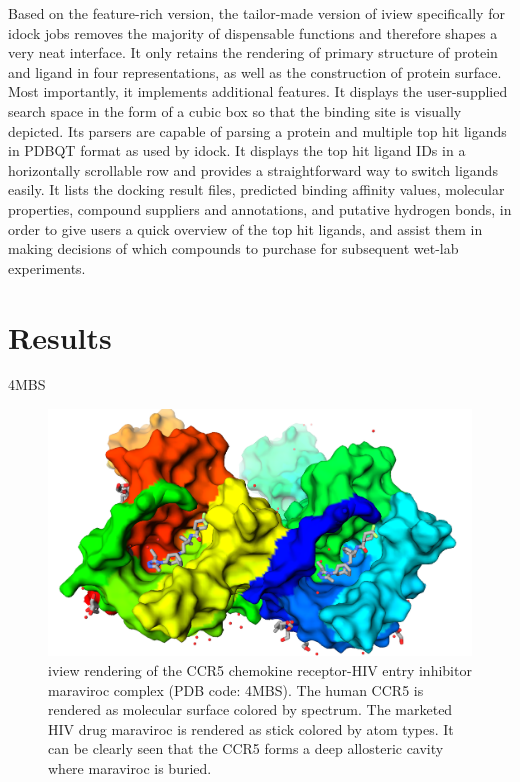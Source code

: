 \documentclass{bioinfo}
\begin{document}
\begin{methods}
Based on the feature-rich version, the tailor-made version of iview specifically for idock jobs removes the majority of dispensable functions and therefore shapes a very neat interface. It only retains the rendering of primary structure of protein and ligand in four representations, as well as the construction of protein surface. Most importantly, it implements additional features. It displays the user-supplied search space in the form of a cubic box so that the binding site is visually depicted. Its parsers are capable of parsing a protein and multiple top hit ligands in PDBQT format as used by idock. It displays the top hit ligand IDs in a horizontally scrollable row and provides a straightforward way to switch ligands easily. It lists the docking result files, predicted binding affinity values, molecular properties, compound suppliers and annotations, and putative hydrogen bonds, in order to give users a quick overview of the top hit ligands, and assist them in making decisions of which compounds to purchase for subsequent wet-lab experiments.

\end{methods}

\section{Results}

4MBS \citep{1348}

\begin{figure}%
\centerline{\includegraphics[width=\linewidth]{4MBS.png}}
\caption{iview rendering of the CCR5 chemokine receptor-HIV entry inhibitor maraviroc complex (PDB code: 4MBS). The human CCR5 is rendered as molecular surface colored by spectrum. The marketed HIV drug maraviroc is rendered as stick colored by atom types. It can be clearly seen that the CCR5 forms a deep allosteric cavity where maraviroc is buried.}\label{fig:4MBS}
\end{figure}
\end{document}
